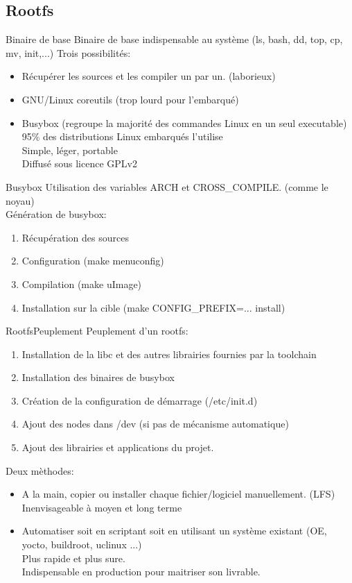 \subsection{Rootfs}
\begin{frame}{Binaire de base}{}
	Binaire de base indispensable au système (ls, bash, dd, top, cp, mv, init,...)
	Trois possibilités:
	\begin{itemize}
		\item
			Récupérer les sources et les compiler un par un. (laborieux)
		\item
			GNU/Linux coreutils (trop lourd pour l'embarqué)
		\item
			Busybox (regroupe la majorité des commandes Linux en un seul executable)
			95\% des distributions Linux embarqués l'utilise\\
			Simple, léger, portable\\
			Diffusé sous licence GPLv2
	\end{itemize}
\end{frame}

\begin{frame}{Busybox}{}
	Utilisation des variables ARCH et CROSS\_COMPILE. (comme le noyau)\\
	Génération de busybox:
	\begin{enumerate}
		\item
			Récupération des sources
		\item
			Configuration (make menuconfig)
		\item
			Compilation (make uImage)
		\item
			Installation sur la cible (make CONFIG\_PREFIX=... install)
	\end{enumerate}
\end{frame}

\begin{frame}{Rootfs}{Peuplement}
	Peuplement d'un rootfs:
	\begin{enumerate}
		\item
			Installation de la libc et des autres librairies fournies par la toolchain\\
		\item
			Installation des binaires de busybox
		\item
			Création de la configuration de démarrage (/etc/init.d)
		\item
			Ajout des nodes dans /dev (si pas de mécanisme automatique)
		\item
			Ajout des librairies et applications du projet.
	\end{enumerate}
	Deux mèthodes:
	\begin{itemize}
		\item
			A la main, copier ou installer chaque fichier/logiciel manuellement. (LFS)\\
			Inenvisageable à moyen et long terme
		\item
			Automatiser soit en scriptant soit en utilisant un système existant (OE, yocto, buildroot, uclinux ...)\\
			Plus rapide et plus sure.\\
			Indispensable en production pour maitriser son livrable.
	\end{itemize}
\end{frame}


